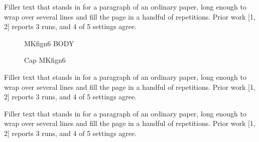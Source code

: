 \documentclass{article}
\begin{document}
Filler text that stands in for a paragraph of an ordinary paper, long enough to wrap over several lines and fill the page in a handful of repetitions. Prior work [1, 2] reports 3 runs, and 4 of 5 settings agree.\par
\begin{figure}[t]\centering MKfign6 BODY\caption{Cap MKfign6}\label{fig:n6}\end{figure}
Filler text that stands in for a paragraph of an ordinary paper, long enough to wrap over several lines and fill the page in a handful of repetitions. Prior work [1, 2] reports 3 runs, and 4 of 5 settings agree.\par
Filler text that stands in for a paragraph of an ordinary paper, long enough to wrap over several lines and fill the page in a handful of repetitions. Prior work [1, 2] reports 3 runs, and 4 of 5 settings agree.\par
\end{document}
